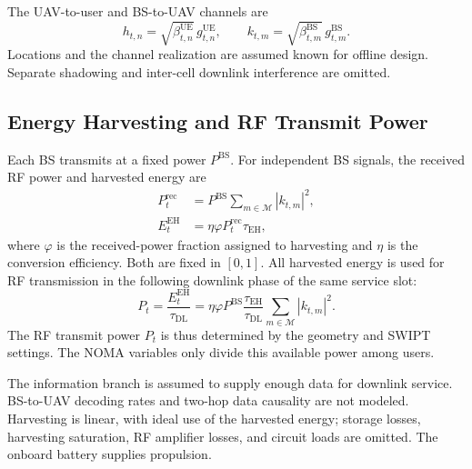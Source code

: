 \documentclass[conference]{IEEEtran}
\newcommand{\UE}{\mathrm{UE}}
\newcommand{\BS}{\mathrm{BS}}
\newcommand{\EH}{\mathrm{EH}}
\newcommand{\DL}{\mathrm{DL}}
\newcommand{\setM}{\mathcal{M}}
\begin{document}
The UAV-to-user and BS-to-UAV channels are
\begin{equation}
h_{t,n}=\sqrt{\beta_{t,n}^{\UE}}\,g_{t,n}^{\UE},\qquad
k_{t,m}=\sqrt{\beta_{t,m}^{\BS}}\,g_{t,m}^{\BS}.
\label{eq:channels}
\end{equation}
Locations and the channel realization are assumed known for offline design. Separate shadowing and inter-cell downlink interference are omitted.

\subsection{Energy Harvesting and RF Transmit Power}
Each BS transmits at a fixed power $P^{\BS}$. For independent BS signals, the received RF power and harvested energy are
\begin{align}
P_t^{\mathrm{rec}}&=P^{\BS}\sum_{m\in\setM}|k_{t,m}|^2,\label{eq:received_power}\\
E_t^{\EH}&=\eta\varphi P_t^{\mathrm{rec}}\tau_{\EH},
\label{eq:harvested_energy}
\end{align}
where $\varphi$ is the received-power fraction assigned to harvesting and $\eta$ is the conversion efficiency. Both are fixed in $[0,1]$. All harvested energy is used for RF transmission in the following downlink phase of the same service slot:
\begin{equation}
P_t=\frac{E_t^{\EH}}{\tau_{\DL}}
=\eta\varphi P^{\BS}\frac{\tau_{\EH}}{\tau_{\DL}}
\sum_{m\in\setM}|k_{t,m}|^2.
\label{eq:uav_power}
\end{equation}
The RF transmit power $P_t$ is thus determined by the geometry and SWIPT settings. The NOMA variables only divide this available power among users.

The information branch is assumed to supply enough data for downlink service. BS-to-UAV decoding rates and two-hop data causality are not modeled. Harvesting is linear, with ideal use of the harvested energy; storage losses, harvesting saturation, RF amplifier losses, and circuit loads are omitted. The onboard battery supplies propulsion.
\end{document}
